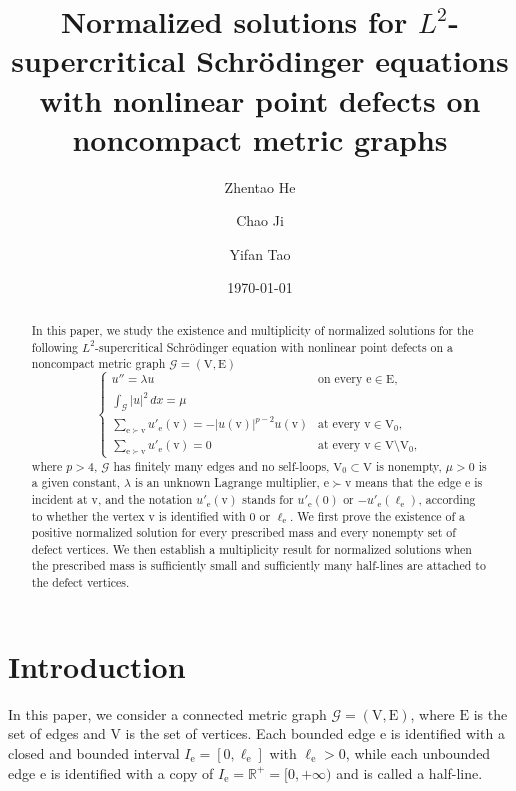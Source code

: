 \documentclass[11pt]{amsart}
\title[The Schr\"odinger equations with nonlinear point defects on noncompact metric graphs]{ Normalized solutions for $L^2$-supercritical Schr\"odinger equations with nonlinear point defects on noncompact metric graphs}
\author[Z. He]{Zhentao He}
\author[C. Ji]{Chao Ji}
\author[Y. Tao]{Yifan Tao}
\date{\today}
\newcommand{\abs}[1]{\lvert#1\rvert}
\newcommand{\G}{\mathcal{G}}
\newcommand{\K}{\mathcal{K}}
\newcommand{\E}{\mathrm{E}}
\newcommand{\V}{\mathrm{V}}
\newcommand{\e}{\mathrm{e}}
\newcommand{\vv}{\mathrm{v}}
\numberwithin{equation}{section}
\begin{document}
\begin{abstract}
In this paper, we study the existence and multiplicity of normalized solutions for the following $L^2$-supercritical Schr\"odinger equation with nonlinear point defects on a noncompact metric graph $\G=(\V,\E)$  
\begin{equation*}
        \begin{cases} 
u'' = \lambda u & \text{on every } \e \in \E, \\ 
\int_\G \abs{u}^2\, dx = \mu & \\
\displaystyle \sum_{\e \succ \vv}  u'_\e(\vv) = -|u(\vv)|^{p-2}u(\vv) & \text{at every } \vv \in \V_0, \\ 
\displaystyle \sum_{\e \succ \vv}  u'_\e(\vv) = 0 & \text{at every } \vv \in \V \setminus \V_0,
\end{cases}
\end{equation*}
where $p>4$,  $\G$ has finitely many edges and no self-loops, $\V_0 \subset \V$ is nonempty, $\mu>0$ is a given constant, $\lambda$ is an unknown Lagrange multiplier, $\e \succ \vv$ means that the edge $\e$ is incident at $\vv$, and the notation $u'_\e(\vv)$ stands for $u'_\e(0)$ or $-u'_\e(\ell_\e)$, according to whether the vertex $\vv$ is identified with $0$ or $\ell_\e$.  We first prove the existence of a positive normalized solution for every prescribed mass and every nonempty set of defect vertices. We then establish a multiplicity result for normalized solutions when the prescribed mass is sufficiently small and sufficiently many half-lines are attached to the defect vertices.
\end{abstract}
\maketitle


\section{Introduction}
In this paper,  we consider a connected metric graph $\G = (\V, \E)$, where $\E$ is the set of edges and $\V$ is the set of vertices. Each bounded edge $\e$ is identified with a closed and bounded interval $I_\e = [0, \ell_\e]$ with $\ell_\e > 0$, while each unbounded edge $\e$ is identified with a copy of $I_\e = \mathbb{R}^+ = [0, +\infty)$ and is called a half-line.
\end{document}
